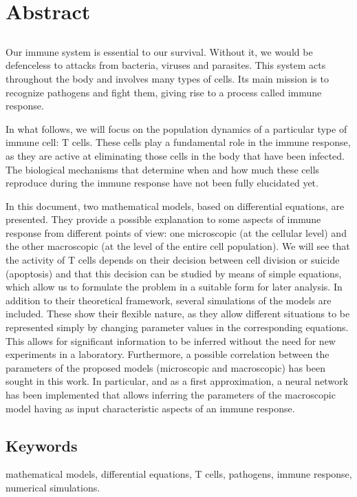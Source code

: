 \chapter*{Abstract}

\section*{}

Our immune system is essential to our survival. Without it, we would be defenceless to attacks from bacteria, viruses and parasites. This system acts throughout the body and involves many types of cells. Its main mission is to recognize pathogens and fight them, giving rise to a process called immune response. 


In what follows, we will focus on the population dynamics of a particular type of immune cell: T cells. These cells play a fundamental role in the immune response, as they are active at eliminating those cells in the body that have been infected. The biological mechanisms that determine when and how much these cells reproduce during the immune response have not been fully elucidated yet. 

In this document, two mathematical models, based on differential equations, are presented. They provide a possible explanation to some aspects of immune response from different points of view: one microscopic (at the cellular level) and the other macroscopic (at the level of the entire cell population). We will see that the activity of T cells depends on their decision between cell division or suicide (apoptosis) and that this decision can be studied by means of simple equations, which allow us to formulate the problem in a suitable form for later analysis. In addition to their theoretical framework, several simulations of the models are included. These show their flexible nature, as they allow different situations to be represented simply by changing parameter values in the corresponding equations. This allows for significant information to be inferred without the need for new experiments in a laboratory. Furthermore, a possible correlation between the parameters of the proposed models (microscopic and macroscopic) has been sought in this work.  In particular, and as a first approximation, a neural network has been implemented that allows inferring the parameters of the macroscopic model having as input characteristic aspects of an immune response.


\section*{Keywords}

\noindent mathematical models, differential equations, T cells, pathogens, immune response, numerical simulations.

